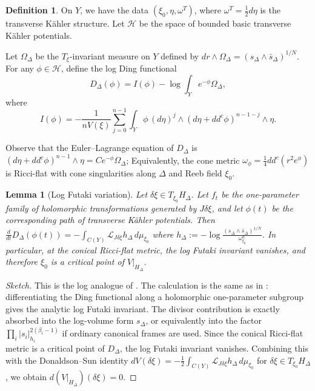 \documentclass[11pt]{amsart}
\newtheorem{lemma}[theorem]{Lemma}
\theoremstyle{definition}
\newtheorem{definition}[theorem]{Definition}
\theoremstyle{remark}
\begin{document}
\begin{definition}
On $Y$, we have the data $(\xi_0,\eta,\omega^T)$, where
$\omega^T=\frac12 d\eta$ is the transverse K\"ahler structure. Let $\mathcal H$
be the space of bounded basic transverse K\"ahler potentials.

Let $\Omega_\Delta$ be the $T_\xi$-invariant measure on $Y$ defined by $dr\wedge \Omega_\Delta  = (s_\Delta\wedge \bar s_\Delta)^{1/N}$.
For any $\phi\in\mathcal H$, define the log Ding functional
\[
        D_\Delta(\phi)
        =
        I(\phi)-\log\int_Y e^{-\phi}\Omega_\Delta ,
\]
where
\[
        I(\phi)=
        -\frac{1}{nV(\xi)}
        \sum_{j=0}^{n-1}
        \int_Y
        \phi\,(d\eta)^j\wedge
        (d\eta+dd^c\phi)^{n-1-j}\wedge \eta .
\]
\end{definition}

 Observe that the Euler--Lagrange equation of $D_\Delta$ is $(d\eta+dd^c\phi)^{n-1}\wedge\eta =
 C e^{-\phi}\Omega_\Delta$; Equivalently, the cone metric $\omega_\phi = \frac14 dd^c(r^2e^\phi)$
is Ricci-flat with cone singularities along $\Delta$ and Reeb field $\xi_0$.

\begin{lemma}[Log Futaki variation]
Let $\delta\xi\in T_{\xi_0}H_\Delta$. Let $f_t$ be the one-parameter family of
holomorphic transformations generated by $J\delta\xi$, and let $\phi(t)$ be the
corresponding path of transverse K\"ahler potentials. Then $\frac{d}{dt}D_\Delta(\phi(t))  = -\int_{C(Y)}\mathcal L_{J\delta\xi}h_\Delta\,d\mu_{\xi_0}$
where  $h_\Delta := -\log \frac{(s_\Delta\wedge\bar s_\Delta)^{1/N}}  {\omega_{\xi_0}^n}$.
In particular, at the conical Ricci-flat metric, the log Futaki invariant vanishes,
and therefore $\xi_0$ is a critical point of $V|_{H_\Delta}$.
\end{lemma}

\begin{proof}[Sketch]
This is the log analogue of \cite[Equations (4.6)--(4.7)]{DSII}. The calculation
is the same as in \cite[Lemma 12]{CDSIII}: differentiating the Ding functional
along a holomorphic one-parameter subgroup gives the analytic log Futaki
invariant. The divisor contribution is exactly absorbed into the log-volume form
$s_\Delta$, or equivalently into the factor
$\prod_i |s_i|_{h_i}^{2(\beta_i-1)}$ if ordinary canonical frames are used.
Since the conical Ricci-flat metric is a critical point of $D_\Delta$, the log
Futaki invariant vanishes. Combining this with the Donaldson--Sun identity \cite[Equations~(4.6)--(4.7)]{DSII} $dV(\delta\xi)
  = -\frac12 \int_{C(Y)}\mathcal L_{J\delta\xi}h_\Delta\,d\mu_{\xi_0}$
for $\delta\xi\in T_{\xi_0}H_\Delta$, we obtain
$d(V|_{H_\Delta})(\delta\xi)=0$.
\end{proof}
\end{document}
